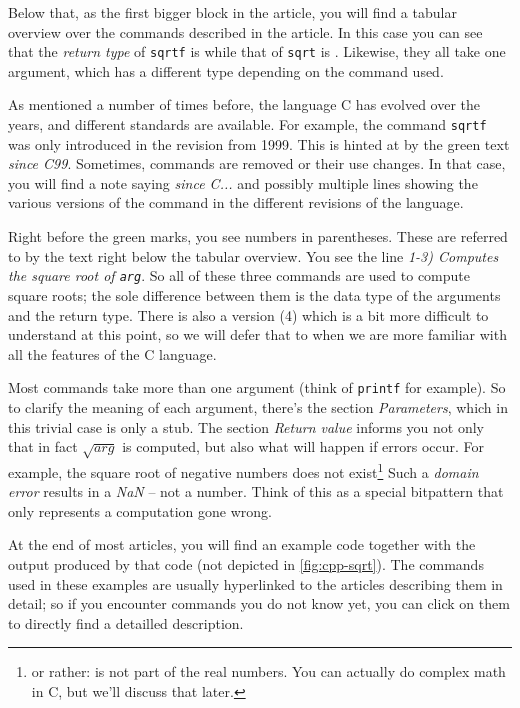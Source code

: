 Below that, as the first bigger block in the article, you will find a tabular overview over the commands described in the article. In this case you can see that the \emph{return type} of \texttt{sqrtf} is  while that of \texttt{sqrt} is . Likewise, they all take one argument, which has a different type depending on the command used.

As mentioned a number of times before, the language C has evolved over the years, and different standards are available. For example, the command \texttt{sqrtf} was only introduced in the revision from 1999. This is hinted at by the green text \emph{since C99}. Sometimes, commands are removed or their use changes. In that case, you will find a note saying \emph{since C...} and possibly multiple lines showing the various versions of the command in the different revisions of the language.

Right before the green marks, you see numbers in parentheses. These are referred to by the text right below the tabular overview. You see the line \emph{1-3) Computes the square root of \texttt{arg}}. So all of these three commands are used to compute square roots; the sole difference between them is the data type of the arguments and the return type. There is also a version (4) which is a bit more difficult to understand at this point, so we will defer that to when we are more familiar with all the features of the C language.
 
Most commands take more than one argument (think of \texttt{printf} for example). So to clarify the meaning of each argument, there's the section \emph{Parameters}, which in this trivial case is only a stub. The section \emph{Return value} informs you not only that in fact $\sqrt{arg}$ is computed, but also what will happen if errors occur. For example, the square root of negative numbers does not exist\footnote{or rather: is not part of the real numbers. You can actually do complex math in C, but we'll discuss that later.} Such a \emph{domain error} results in a \emph{NaN} -- not a number. Think of this as a special bitpattern that only represents a computation gone wrong.

At the end of most articles, you will find an example code together with the output produced by that code (not depicted in \ref{fig:cpp-sqrt}). The commands used in these examples are usually hyperlinked to the articles describing them in detail; so if you encounter commands you do not know yet, you can click on them to directly find a detailled description.

